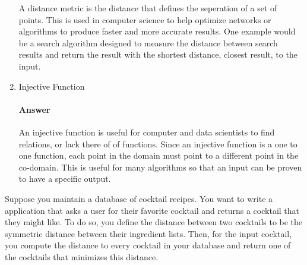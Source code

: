 \documentclass{article}
\begin{document}
\begin{enumerate}
        A distance metric is the distance that defines the seperation of a set of points. This is used in computer science to help optimize networks or algorithms to produce faster and more accurate results. One example would be a search algorithm designed to measure the distance between search results and return the result with the shortest distance, closest result, to the input.

    \item Injective Function

        \paragraph{Answer}

        An injective function is useful for computer and data scientists to find relations, or lack there of of functions. Since an injective function is a one to one function, each point in the domain must point to a different point in the co-domain. This is useful for many algorithms so that an input can be proven to have a specific output.


\end{enumerate}


 

Suppose you maintain a database of cocktail recipes.  You want to write a
application that asks a user for their favorite cocktail and returns a cocktail
that they might like.  To do so, you define the distance between two cocktails
to be the symmetric distance between their ingredient lists.  Then, for the
input cocktail, you compute the distance to every cocktail in your database and
return one of the cocktails that minimizes this distance.
\end{document}
